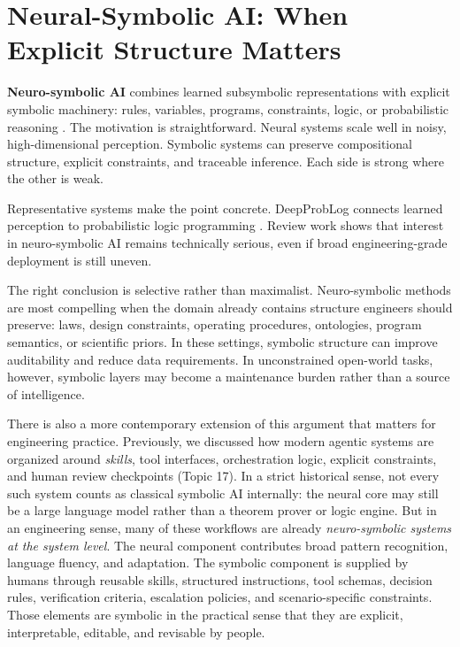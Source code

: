 \documentclass[12pt]{article}
\begin{document}
\section{Neural-Symbolic AI: When Explicit Structure Matters}

\textbf{Neuro-symbolic AI} combines learned subsymbolic representations with explicit symbolic machinery: rules, variables, programs, constraints, logic, or probabilistic reasoning \cite{besold2017nesy}. The motivation is straightforward. Neural systems scale well in noisy, high-dimensional perception. Symbolic systems can preserve compositional structure, explicit constraints, and traceable inference. Each side is strong where the other is weak.

Representative systems make the point concrete. DeepProbLog connects learned perception to probabilistic logic programming \cite{manhaeve2019deepproblog}. Review work shows that interest in neuro-symbolic AI remains technically serious, even if broad engineering-grade deployment is still uneven.

The right conclusion is selective rather than maximalist. Neuro-symbolic methods are most compelling when the domain already contains structure engineers should preserve: laws, design constraints, operating procedures, ontologies, program semantics, or scientific priors. In these settings, symbolic structure can improve auditability and reduce data requirements. In unconstrained open-world tasks, however, symbolic layers may become a maintenance burden rather than a source of intelligence.

There is also a more contemporary extension of this argument that matters for engineering practice. Previously, we discussed how modern agentic systems are organized around \emph{skills}, tool interfaces, orchestration logic, explicit constraints, and human review checkpoints (Topic 17). In a strict historical sense, not every such system counts as classical symbolic AI internally: the neural core may still be a large language model rather than a theorem prover or logic engine. But in an engineering sense, many of these workflows are already \emph{neuro-symbolic systems at the system level}. The neural component contributes broad pattern recognition, language fluency, and adaptation. The symbolic component is supplied by humans through reusable skills, structured instructions, tool schemas, decision rules, verification criteria, escalation policies, and scenario-specific constraints. Those elements are symbolic in the practical sense that they are explicit, interpretable, editable, and revisable by people.
\end{document}
